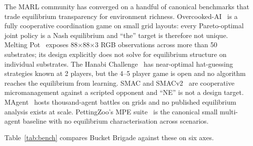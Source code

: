 \documentclass{anvil-paper}
\begin{document}
The MARL community has converged on a handful of canonical benchmarks that
trade equilibrium transparency for environment richness.
Overcooked-AI~\citep{overcooked2019} is a fully cooperative coordination
game on small grid layouts: every Pareto-optimal joint policy is a Nash
equilibrium and ``the'' target is therefore not unique. Melting
Pot~\citep{meltingpot2021} exposes 88$\times$88$\times$3 RGB observations
across more than 50 substrates; its design explicitly does not solve for
equilibrium structure on individual substrates. The Hanabi
Challenge~\citep{hanabi2020} has near-optimal hat-guessing strategies known
at 2 players, but the 4--5 player game is open and no algorithm reaches the
equilibrium from learning. SMAC and SMACv2~\citep{smac2019,smacv2_2023} are
cooperative micromanagement against a scripted opponent and ``NE'' is not a
design target. MAgent~\citep{magent2018} hosts thousand-agent battles on
grids and no published equilibrium analysis exists at scale.
PettingZoo's MPE suite~\citep{pettingzoo2021} is the canonical small
multi-agent baseline with no equilibrium characterisation across scenarios.

Table~\ref{tab:bench} compares Bucket Brigade against these on six axes.
\end{document}
